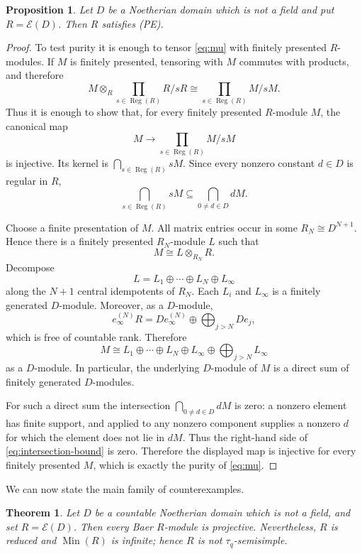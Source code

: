 \documentclass[11pt]{article}
\newtheorem{theorem}{Theorem}[section]
\newtheorem{proposition}[proposition]{Proposition}
\theoremstyle{definition}
\theoremstyle{remark}
\newcommand{\Reg}{\operatorname{Reg}}
\newcommand{\Min}{\operatorname{Min}}
\newcommand{\EC}{\mathcal E}
\begin{document}
\begin{proposition}\label{prop:PEED}
Let $D$ be a Noetherian domain which is not a field and put $R=\EC(D)$.  Then
$R$ satisfies \textup{(PE)}.
\end{proposition}

\begin{proof}
To test purity it is enough to tensor \eqref{eq:mu} with finitely presented
$R$-modules.  If $M$ is finitely presented, tensoring with $M$ commutes with
products, and therefore
\[
 M\otimes_R\prod_{s\in\Reg(R)}R/sR
 \cong \prod_{s\in\Reg(R)}M/sM.
\]
Thus it is enough to show that, for every finitely presented $R$-module $M$,
the canonical map
\[
 M\longrightarrow \prod_{s\in\Reg(R)}M/sM
\]
is injective.  Its kernel is $\bigcap_{s\in\Reg(R)}sM$.  Since every nonzero
constant $d\in D$ is regular in $R$,
\begin{equation}\label{eq:intersection-bound}
 \bigcap_{s\in\Reg(R)}sM
 \subseteq
 \bigcap_{0\ne d\in D}dM.
\end{equation}

Choose a finite presentation of $M$.  All matrix entries occur in some
$R_N\cong D^{N+1}$.  Hence there is a finitely presented $R_N$-module $L$ such that
\[
 M\cong L\otimes_{R_N}R.
\]
Decompose
\[
 L=L_1\oplus\cdots\oplus L_N\oplus L_\infty
\]
along the $N+1$ central idempotents of $R_N$.  Each $L_i$ and $L_\infty$ is a
finitely generated $D$-module.  Moreover, as a $D$-module,
\[
 e_\infty^{(N)}R
 =De_\infty^{(N)}\oplus\bigoplus_{j>N}De_j,
\]
which is free of countable rank.  Therefore
\[
 M\cong L_1\oplus\cdots\oplus L_N
 \oplus L_\infty
 \oplus\bigoplus_{j>N}L_\infty
\]
as a $D$-module.  In particular, the underlying $D$-module of $M$ is a direct
sum of finitely generated $D$-modules.

For such a direct sum the intersection
$\bigcap_{0\ne d\in D}dM$ is zero: a nonzero element has finite support, and
 applied to any nonzero component supplies a nonzero
$d$ for which the element does not lie in $dM$.  Thus the right-hand side of
\eqref{eq:intersection-bound} is zero.  Therefore the displayed map is
injective for every finitely presented $M$, which is exactly the purity of
\eqref{eq:mu}.
\end{proof}

We can now state the main family of counterexamples.

\begin{theorem}\label{thm:EDmain}
Let $D$ be a countable Noetherian domain which is not a field, and set
$R=\EC(D)$.  Then every Baer $R$-module is projective.  Nevertheless, $R$ is
reduced and $\Min(R)$ is infinite; hence $R$ is not $\tau_q$-semisimple.
\end{theorem}
\end{document}

